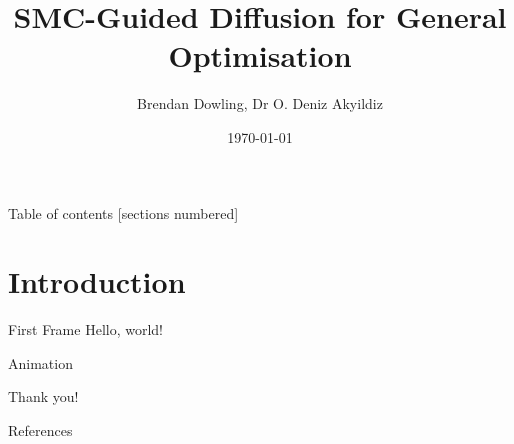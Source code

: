 \documentclass{beamer}
\title{SMC-Guided Diffusion for General Optimisation}
\date{\today}
\author{Brendan Dowling, Dr O. Deniz Akyildiz}
\institute{Imperial College London}
\begin{document}
    \maketitle

    \begin{frame}{Table of contents}
        [sections numbered]
        \tableofcontents[hideallsubsections]
    \end{frame}

    \section{Introduction}
    \begin{frame}{First Frame}
        Hello, world! \textcite{andersonReversetimeDiffusionEquation1982,hoDenoisingDiffusionProbabilistic2020,douDiffusionPosteriorSampling2023,akyildizParallelSequentialMonte2020,delmoralCentralLimitTheorems2011}
    \end{frame}

    \begin{frame}{Animation}
        \centering
    \end{frame}

    {
    \begin{frame}[standout]
        Thank you!
    \end{frame}
    }

    \appendix

    \begin{frame}[allowframebreaks]{References}
        \printbibliography[heading=none]
    \end{frame}
\end{document}
